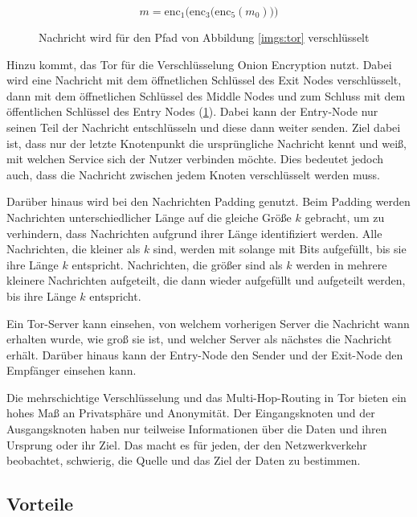 \begin{figure}[!h]
    \begin{displaymath}
        m = \mathrm{enc}_{1}\Big(\mathrm{enc}_{3}\big(\mathrm{enc}_{5}(m_0)\big)\Big)
    \end{displaymath}
    \caption{Nachricht wird für den Pfad von Abbildung \ref{imgs:tor} verschlüsselt}
    \label{equa:encryption}
\end{figure}

Hinzu kommt, das Tor für die Verschlüsselung Onion Encryption nutzt. Dabei wird eine Nachricht mit dem öffnetlichen Schlüssel des Exit Nodes verschlüsselt, dann mit dem öffnetlichen Schlüssel des Middle Nodes und zum Schluss mit dem öffentlichen Schlüssel des Entry Nodes (\ref{equa:encryption}). Dabei kann der Entry-Node nur seinen Teil der Nachricht entschlüsseln und diese dann weiter senden. Ziel dabei ist, dass nur der letzte Knotenpunkt die ursprüngliche Nachricht kennt und weiß, mit welchen Service sich der Nutzer verbinden möchte. Dies bedeutet jedoch auch, dass die Nachricht zwischen jedem Knoten verschlüsselt werden muss.

Darüber hinaus wird bei den Nachrichten Padding genutzt. Beim Padding werden Nachrichten unterschiedlicher Länge auf die gleiche Größe $k$ gebracht, um zu verhindern, dass Nachrichten aufgrund ihrer Länge identifiziert werden. Alle Nachrichten, die kleiner als $k$ sind, werden mit solange mit Bits aufgefüllt, bis sie ihre Länge $k$ entspricht. Nachrichten, die größer sind als $k$ werden in mehrere kleinere Nachrichten aufgeteilt, die dann wieder aufgefüllt und aufgeteilt werden, bis ihre Länge $k$ entspricht.

Ein Tor-Server kann einsehen, von welchem vorherigen Server die Nachricht wann erhalten wurde, wie groß sie ist, und welcher Server als nächstes die Nachricht erhält. Darüber hinaus kann der Entry-Node den Sender und der Exit-Node den Empfänger einsehen kann.

Die mehrschichtige Verschlüsselung und das Multi-Hop-Routing in Tor bieten ein hohes Maß an Privatsphäre und Anonymität. Der Eingangsknoten und der Ausgangsknoten haben nur teilweise Informationen über die Daten und ihren Ursprung oder ihr Ziel. Das macht es für jeden, der den Netzwerkverkehr beobachtet, schwierig, die Quelle und das Ziel der Daten zu bestimmen\footnotemark{}.

\subsection{Vorteile}
\label{chap:tor_advantages}

